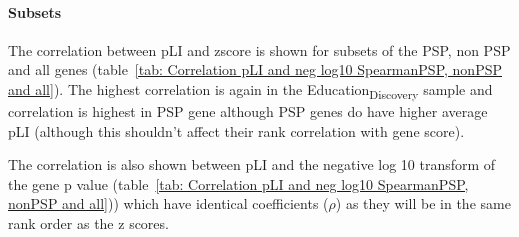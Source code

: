 \paragraph{Subsets}


The correlation between pLI and zscore is shown for subsets of the PSP, non PSP and all genes (table~\ref{tab: Correlation pLI and neg log10 SpearmanPSP, nonPSP and all}). The highest correlation is again in the Education\textsubscript{Discovery} sample and correlation is highest in PSP gene although PSP genes do have higher average pLI (although this shouldn't affect their rank correlation with gene score). 

The correlation is also shown between pLI and the negative log 10 transform of the gene p value (table~\ref{tab: Correlation pLI and neg log10 SpearmanPSP, nonPSP and all})) which have identical coefficients ($\rho$) as they will be in the same rank order as the z scores. 









